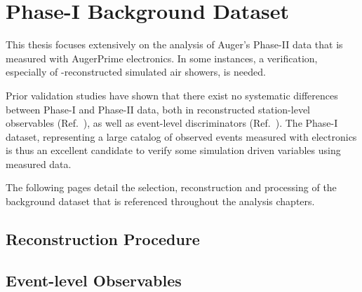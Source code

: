 
\chapter{Phase-I Background Dataset}
\label{chap:phase1-background-dataset}

This thesis focuses extensively on the analysis of Auger's Phase-II data that is
measured with AugerPrime electronics. In some instances, a verification, 
especially of \UUB-reconstructed simulated air showers, is needed.

Prior validation studies have shown that there exist no systematic differences 
between Phase-I and Phase-II data, both in reconstructed station-level 
observables (Ref.~\cite{payerasCompatibilityUBUUB2023}), as well as event-level 
discriminators (Ref.~). The Phase-I dataset, representing a large catalog of observed \CR events measured with \UB electronics is thus an excellent candidate to verify some simulation driven variables using measured data. 

The following pages detail the selection, reconstruction and processing of the 
background dataset that is referenced throughout the analysis chapters.

\section{Reconstruction Procedure}
\label{sec:phase1-reconstruction-procedure}

\section{Event-level Observables}
\label{sec:phase1-event-level-observables}
